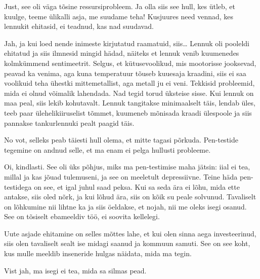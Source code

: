 
Just, see oli väga tõsine ressursiprobleem. Ja olla siis see hull, kes ütleb, et 
kuulge, teeme ülikalli asja, me suudame teha! Kusjuures need 
vennad, kes lennukit ehitasid, ei teadnud, kas nad suudavad. 


Jah, ja kui loed nende inimeste kirjutatud raamatuid, 
siis\ldots{ }Lennuk oli pooleldi ehitatud ja siis ilmnesid mingid hädad, näiteks 
et lennuk venib kuumenedes kolmkümmend sentimeetrit. Selgus, et kütusevoolikud, mis mootorisse jooksevad, 
peavad ka venima, aga kuna temperatuur tõuseb kuuesaja kraadini, 
siis ei saa voolikuid teha ühestki mittemetallist, aga metall ju ei veni. Tekkisid 
probleemid, mida ei olnud võimalik lahendada. Nad tegid torud 
üksteise sisse. Kui lennuk on maa peal, siis lekib kohutavalt. Lennuk 
tangitakse minimaalselt täis, lendab üles, teeb paar ülehelikiiruselist 
tõmmet, kuumeneb mõnisada kraadi ülespoole ja siis pannakse 
tankurlennuki pealt paagid täis. 


No vot, selleks peab täiesti hull olema, et mitte tagasi 
põrkuda. Pen-testide tegemine on andnud selle, et ma enam ei pelga hullusti 
probleeme. 


Oi, kindlasti. See oli üks 
põhjus, miks ma pen-testimise maha jätsin: iial ei tea, millal ja kas jõuad
tulemuseni, ja see on meeletult depressiivne. Teine häda pen-testidega on see, et igal juhul saad peksa. Kui sa seda ära ei lõhu, mida 
ette antakse, siis oled nõrk, ja kui lõhud ära, siis on kõik su peale 
solvunud. Tavaliselt on lõhkumine nii lihtne ka ja siis
öeldakse, et nojah, nii me oleks isegi osanud. See
on tõsiselt ebameeldiv töö, ei soovita kellelegi. 

Uute asjade ehitamine on selles mõttes lahe, et kui olen sinna aega 
investeerinud, siis olen tavaliselt sealt ise midagi saanud ja 
kommuun samuti. See on see koht, kus mulle meeldib 
inseneride hulgas näidata, mida ma tegin. 


Vist jah, ma isegi ei tea, mida sa silmas pead. 


